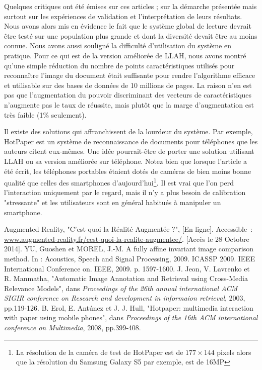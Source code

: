 \documentclass[a4paper]{article}
\begin{document}
Quelques critiques ont été émises sur ces articles ; sur la démarche présentée mais surtout sur les expériences de validation et l'interprétation de leurs résultats. Nous avons alors mis en évidence le fait que le système global de lecture devrait être testé sur une population plus grande et dont la diversité devait être au moins connue. Nous avons aussi souligné la difficulté d'utilisation du système en pratique. Pour ce qui est de la version améliorée de LLAH, nous avons montré qu'une simple réduction du nombre de points caractéristiques utilisés pour reconnaître l'image du document était suffisante pour rendre l'algorithme efficace et utilisable sur des bases de données de 10 millions de pages. La raison n'en est pas que l'augmentation du pouvoir discriminant des vecteurs de caractéristiques n'augmente pas le taux de réussite, mais plutôt que la marge d'augmentation est très faible (1\% seulement).

Il existe des solutions qui affranchissent de la lourdeur du système. Par exemple, HotPaper \cite{hotpaper} est un système de reconnaissance de documents pour téléphones que les auteurs citent eux-mêmes. Une idée pourrait-être de porter une solution utilisant LLAH ou sa version améliorée sur téléphone. Notez bien que lorsque l'article \cite{hotpaper} a été écrit, les téléphones portables étaient dotés de caméras de bien moins bonne qualité que celles des smartphones d'aujourd'hui\footnote{La résolution de la caméra de test de HotPaper est de $177 \times 144$ pixels alors que la résolution du Samsung Galaxy S5 par exemple, est de 16MP}. Il est vrai que l'on perd l'interaction uniquement par le regard, mais il n'y a plus besoin de calibration "stressante" et les utilisateurs sont en général habitués à manipuler un smartphone.

\begin{thebibliography}{1}
	 Augmented Reality, "C'est quoi la Réalité Augmentée ?", [En ligne]. Accessible~: \url{www.augmented-reality.fr/cest-quoi-la-realite-augmentee/}. [Accès le 28 Octobre 2014].
	 YU, Guoshen et MOREL, J.-M. A fully affine invariant image comparison method. In : Acoustics, Speech and Signal Processing, 2009. ICASSP 2009. IEEE International Conference on. IEEE, 2009. p. 1597-1600.
	 J. Jeon, V. Lavrenko et R. Manmatha, "Automatic Image Annotation and Retrieval using Cross-Media Relevance Models", dans \textit{Proceedings of the 26th annual international ACM SIGIR conference on Research and development in informaion retrieval}, 2003, pp.119-126.
	 B. Erol, E. Ant\'unez et J. J. Hull, "Hotpaper: multimedia interaction with paper using mobile phones", dans \textit{Proceedings of the 16th ACM international conference on Multimedia}, 2008, pp.399-408.
\end{thebibliography}
\end{document}
